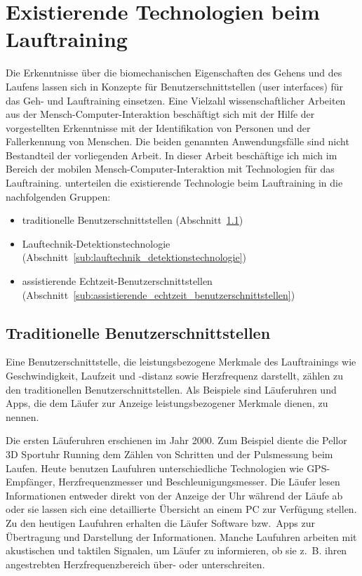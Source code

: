 

\section{Existierende Technologien beim Lauftraining} 

\label{sec:existierende_technologien_beim_lauftraining}

Die Erkenntnisse über die biomechanischen Eigenschaften des Gehens und des Laufens lassen sich in Konzepte für Benutzerschnittstellen (user interfaces) für das Geh- und Lauftraining einsetzen. Eine Vielzahl wissenschaftlicher Arbeiten aus der Mensch-Computer-Interaktion beschäftigt sich mit der Hilfe der vorgestellten Erkenntnisse mit der Identifikation von Personen und der Fallerkennung von Menschen. Die beiden genannten Anwendungsfälle sind nicht Bestandteil der vorliegenden Arbeit. In dieser Arbeit beschäftige ich mich im Bereich der mobilen Mensch-Computer-Interaktion mit Technologien für das Lauftraining. \citet{Jensen2014} unterteilen die existierende Technologie beim Lauftraining in die nachfolgenden Gruppen: 
\begin{itemize}
	\item traditionelle Benutzerschnittstellen (Abschnitt~\ref{sub:traditionelle_benutzerschnittstellen}) 
	\item Lauftechnik-Detektionstechnologie (Abschnitt~\ref{sub:lauftechnik_detektionstechnologie}) 
	\item assistierende Echtzeit-Benutzerschnittstellen (Abschnitt~\ref{sub:assistierende_echtzeit_benutzerschnittstellen}) 
\end{itemize}

\subsection{Traditionelle Benutzerschnittstellen} 

\label{sub:traditionelle_benutzerschnittstellen}

Eine Benutzerschnittstelle, die leistungsbezogene Merkmale des Lauftrainings wie Geschwindigkeit, Laufzeit und -distanz sowie Herzfrequenz darstellt, zählen \citet{Jensen2014} zu den traditionellen Benutzerschnittstellen. Als Beispiele sind Läuferuhren und Apps, die dem Läufer zur Anzeige leistungsbezogener Merkmale dienen, zu nennen.

Die ersten Läuferuhren erschienen im Jahr 2000. Zum Beispiel diente die Pellor 3D Sportuhr Running dem Zählen von Schritten und der Pulsmessung beim Laufen. Heute benutzen Laufuhren unterschiedliche Technologien wie \acs{GPS}-Empfänger, Herzfrequenzmesser und Beschleunigungsmesser. Die Läufer lesen Informationen entweder direkt von der Anzeige der Uhr während der Läufe ab oder sie lassen sich eine detaillierte Übersicht an einem PC zur Verfügung stellen. Zu den heutigen Laufuhren erhalten die Läufer Software bzw.\ Apps zur Übertragung und Darstellung der Informationen. Manche Laufuhren arbeiten mit akustischen und taktilen Signalen, um Läufer zu informieren, ob sie z.~B. ihren angestrebten Herzfrequenzbereich über- oder unterschreiten.

